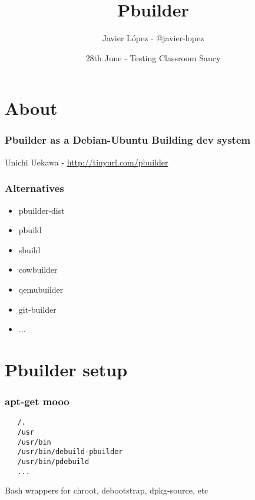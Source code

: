 \documentclass[dvipsnames]{beamer}
\title{Pbuilder}
\author[Javier López]{Javier López - @javier-lopez}
\institute[Testing Classroom Saucy]
{\url{https://wiki.ubuntu.com/Testing/Activities/Classroom/Saucy}}
\date[2013]
     {28th June - Testing Classroom Saucy}
\begin{document}
\begin{frame}
  \titlepage
\end{frame}

\section[About]{About}
\begin{frame}
  \frametitle{Pbuilder as a Debian-Ubuntu Building dev system}
  \begin{center}
    {Unichi Uekawa -}
    \url{http://tinyurl.com/pbuilder}
  \end{center}
\end{frame}

\begin{frame}
  \frametitle{Alternatives}
  \begin{itemize}
  \item pbuilder-dist
  \item pbuild
  \item sbuild
  \item cowbuilder
  \item qemubuilder
  \item git-builder
  \item ...
  \end{itemize}
\end{frame}
\section[Installation]{Pbuilder setup}

\begin{frame}[fragile]
  \frametitle {apt-get mooo}

  \begin{center}
      {\vspace{3 mm}}
  \end{center}

\begin{verbatim}
   /.
   /usr
   /usr/bin
   /usr/bin/debuild-pbuilder
   /usr/bin/pdebuild
   ...
\end{verbatim}
  \begin{center}
        Bash wrappers for chroot, debootstrap, dpkg-source, etc
  \end{center}
\end{frame}
\end{document}
